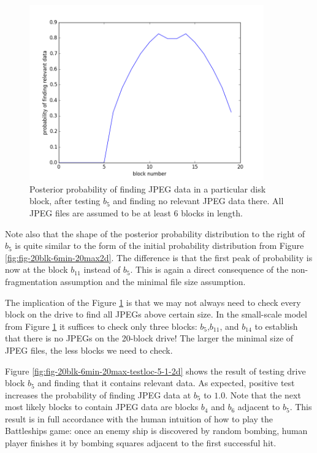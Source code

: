 \documentclass[final,5p,times,twocolumn,authoryear]{elsarticle}
\begin{document}
\begin{figure}
  \centerline{\includegraphics[width=0.9\textwidth]{fig-20blk-6min-20max-testloc-5-0-2d}}
  \caption{Posterior probability of finding JPEG data in a particular disk block, after testing $b_5$ and finding no relevant JPEG data there. All JPEG files are assumed to be at least 6 blocks in length.}
  \label{fig:fig-20blk-6min-20max-testloc-5-0-2d}
\end{figure}

Note also that the shape of the posterior probability distribution to the right of $b_5$ is quite similar to the form of the initial probability distribution from Figure \ref{fig:fig-20blk-6min-20max2d}. The difference is that the first peak of probability is now at the block $b_{11}$ instead of $b_{5}$. This is again a direct consequence of the non-fragmentation assumption and the minimal file size assumption. 

The implication of the Figure \ref{fig:fig-20blk-6min-20max-testloc-5-0-2d} is that we may not always need to check every block on the drive to find all JPEGs above certain size. In the small-scale model from Figure \ref{fig:fig-20blk-6min-20max-testloc-5-0-2d} it suffices to check only three blocks: $b_5$,$b_{11}$, and $b_{14}$ to establish that there is no JPEGs on the 20-block drive! The larger the minimal size of JPEG files, the less blocks we need to check.

Figure \ref{fig:fig-20blk-6min-20max-testloc-5-1-2d} shows the result of testing drive block $b_5$ and finding that it contains relevant data. As expected, positive test increases the probability of finding JPEG data at $b_5$ to $1.0$. Note that the next most likely blocks to contain JPEG data are blocks $b_4$ and $b_6$ adjacent to $b_5$. This result is in full accordance with the human intuition of how to play the Battleships game: once an enemy ship is discovered by random bombing, human player finishes it by bombing squares adjacent to the first successful hit.
\end{document}
